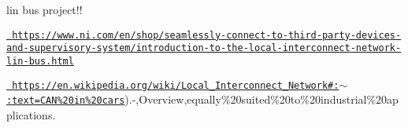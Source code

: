 lin bus project!!

\href{https://www.ni.com/en/shop/seamlessly-connect-to-third-party-devices-and-supervisory-system/introduction-to-the-local-interconnect-network-lin-bus.html}{\texttt{ https\+://www.\+ni.\+com/en/shop/seamlessly-\/connect-\/to-\/third-\/party-\/devices-\/and-\/supervisory-\/system/introduction-\/to-\/the-\/local-\/interconnect-\/network-\/lin-\/bus.\+html}}

\href{https://en.wikipedia.org/wiki/Local_Interconnect_Network\#:~:text=CAN\%20in\%20cars}{\texttt{ https\+://en.\+wikipedia.\+org/wiki/\+Local\+\_\+\+Interconnect\+\_\+\+Network\#\+:$\sim$\+:text=\+CAN\%20in\%20cars}}).-\/,Overview,equally\%20suited\%20to\%20industrial\%20applications. 